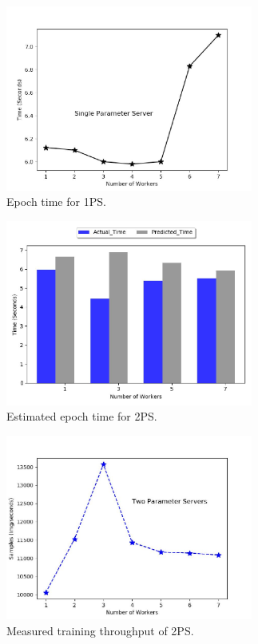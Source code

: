\documentclass[conference]{IEEEtran}
\begin{document}
\begin{figure}[htb]
  \includegraphics[width=3.2in]{Fig/pslatency.jpg}
  \caption{Epoch time for 1PS.}
  \label{fig:pslatency}
\end{figure}

\begin{figure}[htb]
  \includegraphics[width=3.2in]{Fig/2psmodel.jpg}
  \caption{Estimated epoch time for 2PS.}
  \label{fig:2psmodel}
\end{figure}

\begin{figure}[htb]
  \includegraphics[width=3.2in]{Fig/2psthroughput.jpg}
  \caption{Measured training throughput of 2PS.}
  \label{fig:2psthroughput}
\end{figure}
\end{document}
